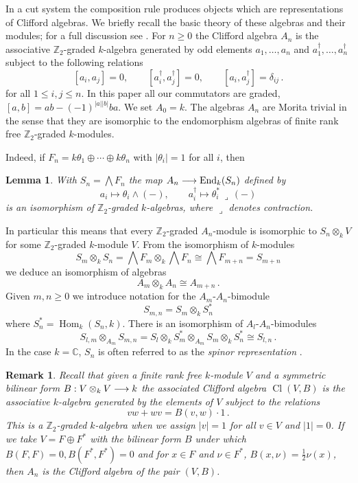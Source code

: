 \documentclass[english,letter paper,12pt,leqno]{article}
\newtheorem{lemma}[theorem]{Lemma}
\theoremstyle{example}
\newtheorem{remark}[theorem]{Remark}
\numberwithin{equation}{section}
\def\Hom{\operatorname{Hom}}
\DeclareMathOperator{\End}{End}
\begin{document}
In a cut system the composition rule produces objects which are representations of Clifford algebras. We briefly recall the basic theory of these algebras and their modules; for a full discussion see \cite{friedrich}. For $n \ge 0$ the Clifford algebra $A_n$ is the associative $\mathbb{Z}_2$-graded $k$-algebra generated by odd elements $a_1,\ldots,a_n$ and $a_1^\dagger, \ldots, a_n^\dagger$ subject to the following relations
\[
[a_i, a_j] = 0, \qquad [a_i^\dagger, a_j^\dagger] = 0, \qquad [a_i, a_j^\dagger] = \delta_{ij}\,.
\]
for all $1 \le i, j \le n$. In this paper all our commutators are graded, $[a,b] = ab - (-1)^{|a||b|} ba$. We set $A_0 = k$. The algebras $A_n$ are Morita trivial in the sense that they are isomorphic to the endomorphism algebras of finite rank free $\mathbb{Z}_2$-graded $k$-modules. 

Indeed, if $F_n = k \theta_1 \oplus \cdots \oplus k \theta_n$ with $|\theta_i| = 1$ for all $i$, then

\begin{lemma} With $S_n = \bigwedge F_n$ the map $A_n \lto \End_k(S_n)$ defined by
\[
a_i \mapsto \theta_i \wedge (-), \qquad a_i^\dagger \mapsto \theta_i^*\, \lrcorner\, (-)
\]
is an isomorphism of $\mathbb{Z}_2$-graded $k$-algebras, where $\lrcorner$ denotes contraction.
\end{lemma}

In particular this means that every $\mathbb{Z}_2$-graded $A_n$-module is isomorphic to $S_n \otimes_k V$ for some $\mathbb{Z}_2$-graded $k$-module $V$. From the isomorphism of $k$-modules
\[
S_m \otimes_k S_n = \bigwedge F_m \otimes_k \bigwedge F_n \cong \bigwedge F_{m+n} = S_{m+n}
\]
we deduce an isomorphism of algebras
\begin{equation}\label{eq:algebra_A_additive}
A_m \otimes_k A_n \cong A_{m+n}\,.
\end{equation}
Given $m, n \ge 0$ we introduce notation for the $A_m$-$A_n$-bimodule
\begin{equation}
S_{m,n} = S_m \otimes_k S_n^*
\end{equation}
where $S_n^* = \Hom_k(S_n, k)$. There is an isomorphism of $A_l$-$A_n$-bimodules
\begin{equation}\label{eq:isosbimodule}
S_{l,m} \otimes_{A_m} S_{m,n} = S_l \otimes_k S_m^* \otimes_{A_m} S_m \otimes_k S_n^* \cong S_{l,n}\,.
\end{equation}
In the case $k = \mathbb{C}$, $S_n$ is often referred to as the \emph{spinor representation} \cite[p.14]{friedrich}.

\begin{remark} Recall that given a finite rank free $k$-module $V$ and a symmetric bilinear form $B: V \otimes_k V \longrightarrow k$ the associated Clifford algebra $\operatorname{Cl}(V, B)$ is the associative $k$-algebra generated by the elements of $V$ subject to the relations
\[
vw + wv = B(v,w) \cdot 1\,.
\]
This is a $\mathbb{Z}_2$-graded $k$-algebra when we assign $|v| = 1$ for all $v \in V$ and $|1| = 0$. If we take $V = F \oplus F^*$ with the bilinear form $B$ under which $B(F,F) = 0, B(F^*, F^*) = 0$ and for $x \in F$ and $\nu \in F^*$, $B(x, \nu) = \frac{1}{2} \nu(x)$, then $A_n$ is the Clifford algebra of the pair $(V,B)$.
\end{remark}
\end{document}
